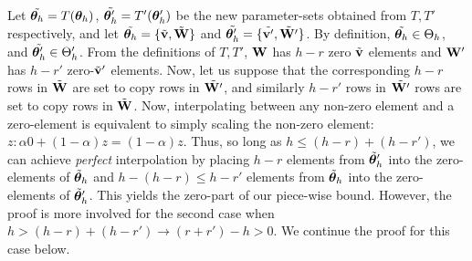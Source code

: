 Let $\Tilde{\bm{\theta}_h}=T(\bm{\theta}_h)$, $\Tilde{\bm{\theta}_h'}=T'(\bm{\theta}_h')$ be the new parameter-sets obtained from $T, T'$ respectively, and let $\Tilde{\bm{\theta}_h}=\{\Tilde{{\mathbf{v}}},\Tilde{{\mathbf{W}}}\}$ and $\Tilde{\bm{\theta}_h'}=\{\Tilde{{\mathbf{v'}}},\Tilde{{\mathbf{W'}}}\}$. 
By definition, $\Tilde{\bm{\theta}_h}\in\Theta_h$, and $\Tilde{\bm{\theta}_h'}\in\Theta_h'$. 
From the definitions of $T,T'$, ${\mathbf{W}}$ has $h-r$ zero $\Tilde{{\mathbf{v}}}$ elements and ${\mathbf{W'}}$ has $h-r'$ zero-$\Tilde{{\mathbf{v}}}'$ elements.
Now, let us suppose that the corresponding $ h-r$ rows in $\Tilde{{\mathbf{W}}}$ are set to copy rows in $\Tilde{{\mathbf{W'}}}$, and similarly $h-r'$ rows in $\Tilde{{\mathbf{W'}}}$ rows are set to copy rows in $\Tilde{{\mathbf{W}}}$.
Now, interpolating between any non-zero element and a zero-element is equivalent to simply scaling the non-zero element: $z: \alpha 0 + (1-\alpha)z=(1-\alpha)z$. 
Thus, so long as $h\leq (h-r) + (h-r')$, we can achieve \textit{perfect} interpolation by placing $h-r$ elements from $\Tilde{\bm{\theta}}_h'$ into 
the zero-elements of $\Tilde{\bm{\theta}}_h$ and $h-(h-r) \leq h-r'$ elements from $\Tilde{\bm{\theta}}_h$ into the zero-elements of $\Tilde{\bm{\theta}}_h'$. 
This yields the zero-part of our piece-wise bound.
However, the proof is more involved for the second case when $h > (h-r) + (h-r') \rightarrow (r+r') - h > 0$. We continue the proof for this case below.


